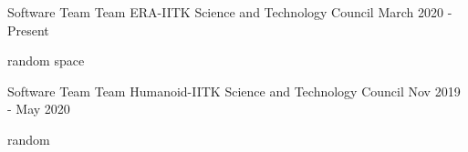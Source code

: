 \begin{cventries}

\cventry
  {Software Team}
  {Team ERA-IITK}
  {Science and Technology Council}
  {March 2020 - Present}
  {
     \begin{cvitems}
     \item random space
     \end{cvitems}
  }
\cventry
  {Software Team}
  {Team Humanoid-IITK}
  {Science and Technology Council}
  {Nov 2019 - May 2020}
  {
     \begin{cvitems}
     \item random
     \end{cvitems}
  }
\end{cventries}
